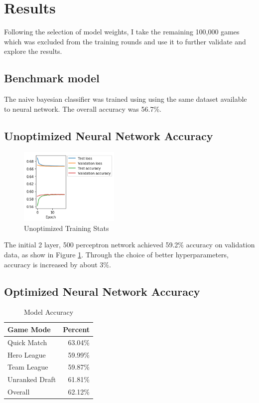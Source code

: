 \documentclass[twoside,twocolumn]{article}
\begin{document}
\section {Results}

Following the selection of model weights, I take the remaining 100,000 games which was excluded from the training rounds and use it to further validate and explore the results.  

\subsection {Benchmark model}

The naive bayesian classifier was trained using  using the same dataset available to neural network.  The overall accuracy was 56.7\%.

\subsection {Unoptimized Neural Network Accuracy}

\begin{figure}
\caption{Unoptimized Training Stats}
\label{figure:500training}
\includegraphics[width=136pt]{500training}
\end{figure}

The initial 2 layer, 500 perceptron network achieved 59.2\% accuracy on validation data, as show in Figure \ref{figure:500training}.  Through the choice of better hyperparameters, accuracy is increased by about 3\%.

\subsection {Optimized Neural Network Accuracy}

\begin{table}[h]
\caption{Model Accuracy}
\label{table:acc}
\centering
\begin{tabular}{lr}
\toprule
Game Mode & Percent \\
\midrule
Quick Match & 63.04\% \\
Hero League & 59.99\% \\
Team League & 59.87\% \\
Unranked Draft & 61.81\% \\
\midrule
Overall & 62.12\% \\
\bottomrule
\end{tabular}
\end{table}
\end{document}
